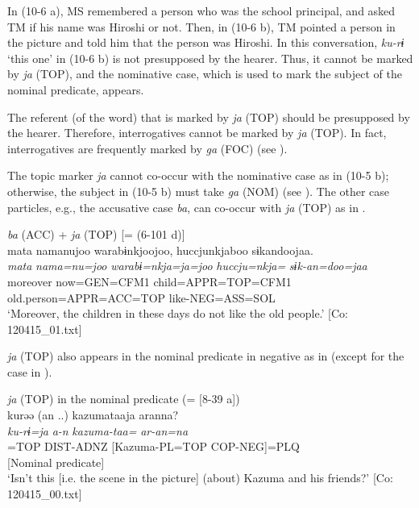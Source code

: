 In (10-6 a), MS remembered a person who was the school principal, and asked TM if his name was Hiroshi or not. Then, in (10-6 b), TM pointed a person in the picture and told him that the person was Hiroshi. In this conversation, \textit{ku-rɨ} ‘this one’ in (10-6 b) is not presupposed by the hearer. Thus, it cannot be marked by \textit{ja} (TOP), and the nominative case, which is used to mark the subject of the nominal predicate, appears.

  The referent (of the word) that is marked by \textit{ja} (TOP) should be presupposed by the hearer. Therefore, interrogatives cannot be marked by \textit{ja} (TOP). In fact, interrogatives are frequently marked by \textit{ga} (FOC) (see ).

  The topic marker \textit{ja} cannot co-occur with the nominative case as in (10-5 b); otherwise, the subject in (10-5 b) must take \textit{ga} (NOM) (see ). The other case particles, e.g., the accusative case \textit{ba}, can co-occur with \textit{ja} (TOP) as in .

\ea\label{ex:10.7}   \textit{ba} (ACC) + \textit{ja} (TOP) [= (6-101 d)]\\
      \glll    mata  namanujoo  warabɨnkjoojoo, huccjunkjaboo  sɨkandoojaa.\\
    \textit{mata}  \textit{nama=nu=joo}  \textit{warabɨ=nkja=ja=joo}    \textit{huccju=nkja=}  \textit{sɨk-an=doo=jaa}\\
    moreover  now=GEN=CFM1  child=APPR=TOP=CFM1  old.person=APPR=ACC=TOP  like-NEG=ASS=SOL\\
\glt     ‘Moreover, the children in these days do not like the old people.’  [Co: 120415\_01.txt]
\z

  \textit{ja} (TOP) also appears in the nominal predicate in negative as in  (except for the case in ).

\ea\label{ex:10.8}   \textit{ja} (TOP) in the nominal predicate (= [8-39 a])\\
      \gllll    kurəə  {(an ..)}  kazumataaja  aranna?\\
    \textit{ku-rɨ=ja}  \textit{a-n}  \textit{kazuma-taa=}  \textit{ar-an=na}\\
    [PROX-NLZ]=TOP  DIST-ADNZ  [Kazuma-PL=TOP  COP-NEG]=PLQ\\
    [Subject]    [Nominal predicate]\\
    \glt ‘Isn’t this [i.e. the scene in the picture] (about) Kazuma and his friends?’ [Co: 120415\_00.txt]
\z    

